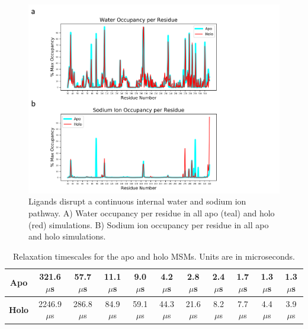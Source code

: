 \begin{figure}[htbp]
\centering
\includegraphics[width=\textwidth]{./figures/water_na_plots.png}
\caption{Ligands disrupt a continuous internal water and sodium ion pathway. A) Water occupancy per residue in all apo (teal) and holo (red) simulations. B) Sodium ion occupancy per residue in all apo and holo simulations.}
\label{fig:water_na_plots}
\end{figure}

\begin{table}[htbp]
\centering
\begin{tabular}{|c|c|c|c|c|c|c|c|c|c|c|}
\hline
\textbf{Apo} & 321.6 $\mu$s & 57.7 $\mu$s & 11.1 $\mu$s & 9.0 $\mu$s & 4.2 $\mu$s & 2.8 $\mu$s & 2.4 $\mu$s & 1.7 $\mu$s & 1.3 $\mu$s & 1.3 $\mu$s\\ \hline
\textbf{Holo} & 2246.9 $\mu$s & 286.8 $\mu$s & 84.9 $\mu$s & 59.1 $\mu$s & 44.3 $\mu$s & 21.6 $\mu$s & 8.2 $\mu$s & 7.7 $\mu$s & 4.4 $\mu$s & 3.9 $\mu$s \\ \hline
\end{tabular}
\caption{Relaxation timescales for the apo and holo MSMs. Units are in microseconds.}
\label{table:relaxation_timescales}
\end{table}

